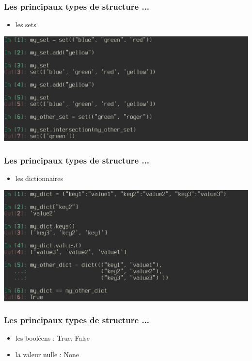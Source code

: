 \begin{frame}
  \frametitle{Les principaux types de structure ...}
    \begin{itemize}
      \item les sets
    \end{itemize}
    \includegraphics[scale=0.35]{type_set.png}
\end{frame}

\begin{frame}
  \frametitle{Les principaux types de structure ...}
    \begin{itemize}
      \item les dictionnaires
    \end{itemize}
    \includegraphics[scale=0.35]{type_dict.png}
\end{frame}

\begin{frame}
  \frametitle{Les principaux types de structure ...}
    \begin{itemize}
      \item les booléens : True, False
      \item la valeur nulle : None
    \end{itemize}
\end{frame}


